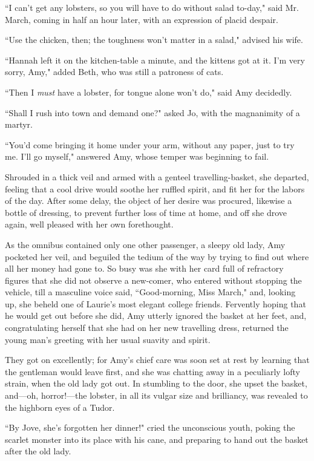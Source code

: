``I can't get any lobsters, so you will have to do
without salad to-day," said Mr. March, coming in half an hour later,
with an expression of placid despair.

``Use the chicken, then; the toughness won't matter in a
salad," advised his wife.

``Hannah left it on the kitchen-table a minute, and the kittens got at
it. I'm very sorry, Amy," added Beth, who was still a
patroness of cats.

``Then I \emph{must} have a lobster, for tongue alone
won't do," said Amy decidedly.

``Shall I rush into town and demand one?" asked Jo, with the magnanimity
of a martyr.

``You'd come bringing it home under your arm, without any
paper, just to try me. I'll go myself," answered Amy,
whose temper was beginning to fail.

Shrouded in a thick veil and armed with a genteel travelling-basket, she
departed, feeling that a cool drive would soothe her ruffled spirit, and
fit her for the labors of the day. After some delay, the object of her
desire was procured, likewise a bottle of dressing, to prevent further
loss of time at home, and off she drove again, well pleased with her own
forethought.

As the omnibus contained only one other passenger, a sleepy old lady,
Amy pocketed her veil, and beguiled the tedium of the way by trying to
find out where all her money had gone to. So busy was she with her card
full of refractory figures that she did not observe a new-comer, who
entered without stopping the vehicle, till a masculine voice said,
``Good-morning, Miss March," and, looking up, she beheld one of
Laurie's most elegant college friends. Fervently hoping
that he would get out before she did, Amy utterly ignored the basket at
her feet, and, congratulating herself that she had on her new travelling
dress, returned the young man's greeting with her usual
suavity and spirit.

They got on excellently; for Amy's chief care was soon
set at rest by learning that the gentleman would leave first, and she
was chatting away in a peculiarly lofty strain, when the old lady got
out. In stumbling to the door, she upset the basket, and---oh,
horror!---the lobster, in all its vulgar size and brilliancy, was
revealed to the highborn eyes of a Tudor.

``By Jove, she's forgotten her dinner!" cried the
unconscious youth, poking the scarlet monster into its place with his
cane, and preparing to hand out the basket after the old lady.

